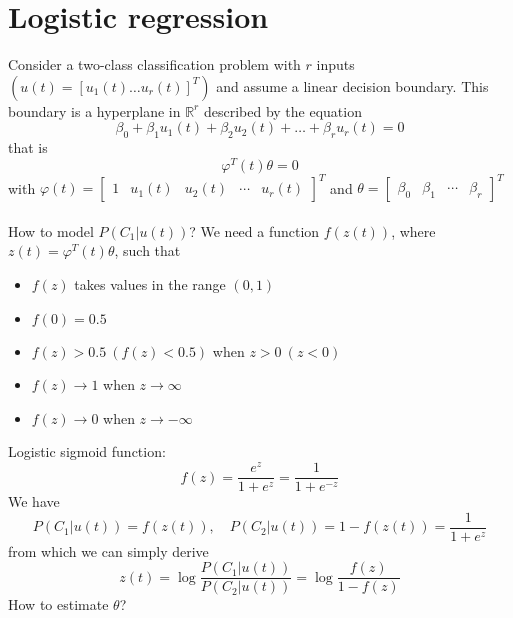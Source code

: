 \documentclass{book}
\theoremstyle{definition}
\theoremstyle{remark}
\theoremstyle{remark}
\begin{document}
\section{Logistic regression}
Consider a two-class classification problem with $r$ inputs $(u(t)=[u_1(t)\dots u_r(t)]^T)$ and assume a linear decision boundary. This boundary is a hyperplane in $\mathbb{R}^r$ described by the equation 
\[
    \beta_0+ \beta_1 u_1(t) + \beta_2u_2(t) +\dots + \beta_ru_r(t) = 0
\]
that is 
\[
    \varphi^T(t)\theta=0
\]
with $\varphi(t)=\begin{bmatrix}
    1 & u_1(t) & u_2(t) & \cdots & u_r(t)
\end{bmatrix}^T $ and $\theta=\begin{bmatrix}
    \beta_0 & \beta_1 & \cdots & \beta_r
\end{bmatrix}^T$
\\
\\
How to model $P(C_1|u(t))$?
We need a function $f(z(t))$, where $z(t) = \varphi^T(t)\theta$, such that 
\begin{itemize}
    \item $f(z)$ takes values in the range $(0,1)$
    \item $f(0)=0.5$ 
    \item $f(z)>0.5\ (f(z)<0.5)$ when $z>0\  (z<0)$
    \item $f(z)\to 1$ when $z\to\infty$
    \item $f(z)\to 0$ when $z\to-\infty$
\end{itemize}
Logistic sigmoid function: 
\[
    f(z)=\displaystyle\frac{e^z}{1+e^z}=\displaystyle\frac{1}{1+e^{-z}}
\]
We have
\[
    P(C_1|u(t))=f(z(t)), \quad P(C_2|u(t))=1-f(z(t))=\displaystyle\frac{1}{1+e^z}
\]
from which we can simply derive
\[
    z(t)=\log \displaystyle\frac{P(C_1|u(t))}{P(C_2|u(t))}=\log \displaystyle\frac{f(z)}{1-f(z)}
\]
How to estimate $\theta$?
\end{document}
